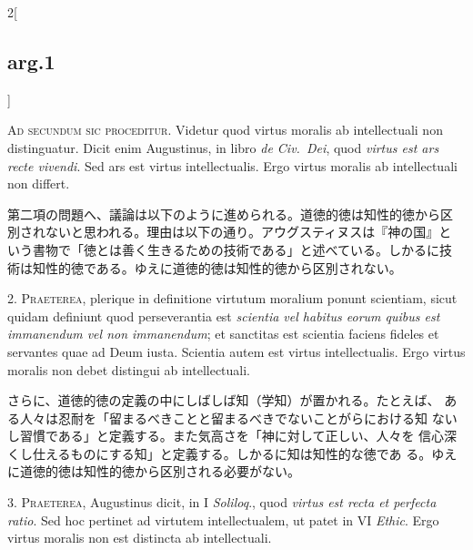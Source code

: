 \documentclass[paper=a4paper,fontsize=10pt,jafontsize=9pt,titlepage]{jlreq}
\begin{document}
\begin{paracol}{2}[\subsection{arg.1}]

{\scshape Ad secundum sic proceditur}. Videtur quod virtus moralis ab
intellectuali non distinguatur. Dicit enim Augustinus, in libro
{\itshape de Civ.~Dei}, quod {\itshape virtus est ars recte
vivendi}. Sed ars est virtus intellectualis. Ergo virtus moralis ab
intellectuali non differt.

\switchcolumn

第二項の問題へ、議論は以下のように進められる。道徳的徳は知性的徳から区
別されないと思われる。理由は以下の通り。アウグスティヌスは『神の国』と
いう書物で「徳とは善く生きるための技術である」と述べている。しかるに技
術は知性的徳である。ゆえに道徳的徳は知性的徳から区別されない。


2. {\scshape Praeterea}, plerique in definitione virtutum moralium ponunt
scientiam, sicut quidam definiunt quod perseverantia est {\itshape scientia vel
habitus eorum quibus est immanendum vel non immanendum}; et sanctitas
est scientia faciens fideles et servantes quae ad Deum iusta. Scientia
autem est virtus intellectualis. Ergo virtus moralis non debet
distingui ab intellectuali.

\switchcolumn

さらに、道徳的徳の定義の中にしばしば知（学知）が置かれる。たとえば、
 ある人々は忍耐を「留まるべきことと留まるべきでないことがらにおける知
 ないし習慣である」と定義する。また気高さを「神に対して正しい、人々を
 信心深くし仕えるものにする知」と定義する。しかるに知は知性的な徳であ
 る。ゆえに道徳的徳は知性的徳から区別される必要がない。


3. {\scshape Praeterea}, Augustinus dicit, in I {\itshape Soliloq}.,
quod {\itshape virtus est recta et perfecta ratio}. Sed hoc pertinet
ad virtutem intellectualem, ut patet in VI {\itshape Ethic}. Ergo
virtus moralis non est distincta ab intellectuali.


\end{paracol}
\end{document}

